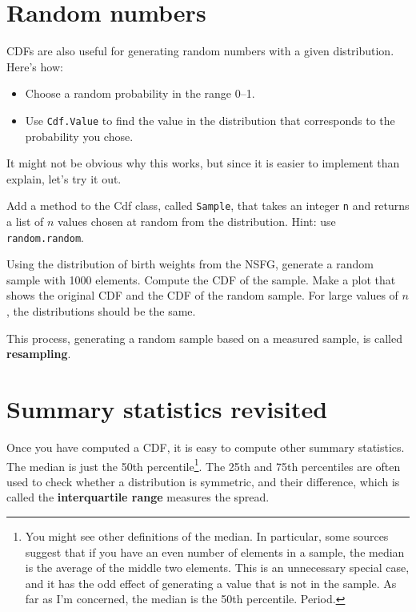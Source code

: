 \documentclass[12pt]{book}
\begin{document}
\section{Random numbers}

CDFs are also useful for generating random numbers
with a given distribution.  Here's how:

\begin{itemize}

\item Choose a random probability in the range 0--1.

\item Use {\tt Cdf.Value} to find the value in the distribution
that corresponds to the probability you chose.

\end{itemize}

It might not be obvious why this works, but since it is easier
to implement than explain, let's try it out.

\begin{ex}

Add a method to the Cdf class, called {\tt Sample}, that takes
an integer {\tt n} and returns a list of $n$ values chosen at
random from the distribution.  Hint: use {\tt random.random}.

Using the distribution of birth weights from the NSFG, generate a
random sample with 1000 elements.  Compute the CDF of the sample.
Make a plot that shows the original CDF and the CDF of the random
sample.  For large values of $n$, the distributions should be
the same.

\end{ex}

This process, generating a random sample based on a measured sample,
is called {\bf resampling}.


\section{Summary statistics revisited}

Once you have computed a CDF, it is easy to compute other summary
statistics.  The median is just the 50th percentile\footnote{You might
see other definitions of the median.  In particular,
some sources suggest that if you have an even number of elements in
a sample, the median is the average of the middle two elements.
This is an unnecessary special case, and it has the odd effect of
generating a value that is not in the sample.  As far
as I'm concerned, the median is the 50th percentile.  Period.}.
The 25th and 75th percentiles are often used to check whether
a distribution is symmetric, and their difference, which is called
the {\bf interquartile range} measures the spread.
\end{document}
